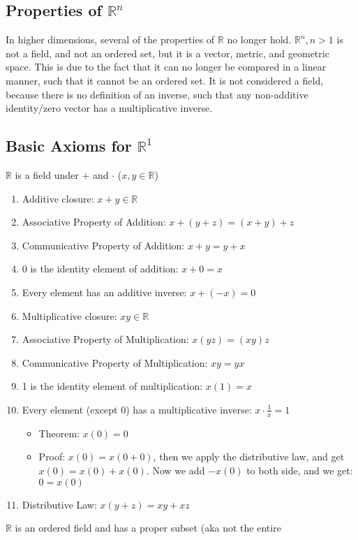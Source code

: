 \documentclass[11 pt, twoside]{article}
\begin{document}
\subsection{Properties of $\mathbb{R}^n$}
In higher dimensions, several of the properties of $\mathbb{R}$ no longer hold.
$\mathbb{R}^n, n > 1$ is not a field, and not an ordered set, but it is a vector, metric, and geometric space. This is due to the fact that it can no longer be compared in a linear manner, such that it cannot be an ordered set. It is not considered a field, because there is no definition of an inverse, such that any non-additive identity/zero vector has a multiplicative inverse.
\subsection{Basic Axioms for $\mathbb{R}^1$}
$\mathbb{R}$ is a field under $+$ and $\cdot$ ($x, y \in \mathbb{R}$)
\begin{enumerate}
\item Additive closure: $x + y \in \mathbb{R}$
\item Associative Property of Addition: $x + (y + z) = (x + y) + z$
\item Communicative Property of Addition: $x + y = y + x$
\item 0 is the identity element of addition: $x + 0 = x$
\item Every element has an additive inverse: $x + (-x) = 0$
\item Multiplicative closure: $xy \in \mathbb{R}$
\item Associative Property of Multiplication: $x(yz) = (xy)z$
\item Communicative Property of Multiplication: $xy = yx$
\item 1 is the identity element of multiplication: $x(1) = x$
\item Every element (except 0) has a multiplicative inverse: $x \cdot \frac{1}{x} = 1$
\begin{itemize}
\item Theorem: $x(0) = 0$
\item Proof: $x(0) = x(0 + 0)$, then we apply the distributive law,
and get $x(0) = x(0) + x(0)$. Now we add $-x(0)$ to both side,
and we get: $0 = x(0)$
\end{itemize}
\item Distributive Law: $x(y + z) = xy + xz$
\end{enumerate}
\vspace{11pt}
$\mathbb{R}$ is an ordered field and has a proper subset (aka not the entire
\end{document}

